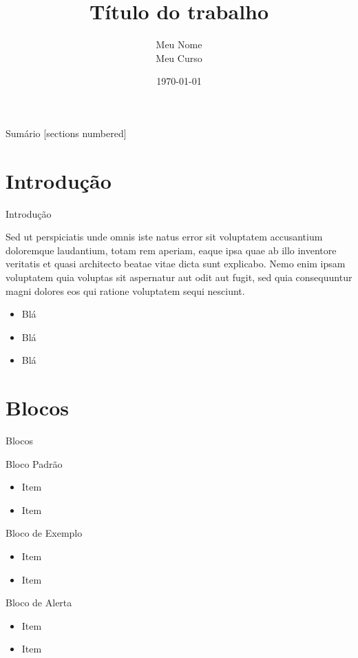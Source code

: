 \documentclass{beamer}
\title{Título do trabalho}
\date{\today}
\author{Meu Nome \\ Meu Curso}
\institute{Universidade Federal do Pampa}
\begin{document}
	
	\begin{frame}[noframenumbering]
		\titlepage
		\thispagestyle{empty}
	\end{frame}
	
	\begin{frame}{Sumário}
		[sections numbered]
		\tableofcontents[hideallsubsections]
	\end{frame}

\section{Introdução}
\begin{frame}{Introdução}
	
	Sed ut perspiciatis unde omnis iste natus error sit voluptatem accusantium doloremque laudantium, totam rem aperiam, eaque ipsa quae ab illo inventore veritatis et quasi architecto beatae vitae dicta sunt explicabo. Nemo enim ipsam voluptatem quia voluptas sit aspernatur aut odit aut fugit, sed quia consequuntur magni dolores eos qui ratione voluptatem sequi nesciunt. 
	
	\begin{itemize}
		\item Blá
		\item Blá
		\item Blá
	\end{itemize}

\end{frame}


\section{Blocos}

\begin{frame}{Blocos}

	\begin{block}{Bloco Padrão}
		\begin{itemize}
			\item Item
			\item Item
		\end{itemize}
	\end{block}
	
	
	\begin{exampleblock}{Bloco de Exemplo}
		\begin{itemize}
			\item Item
			\item Item
		\end{itemize}
	\end{exampleblock}
	
	\begin{alertblock}{Bloco de Alerta}
		\begin{itemize}
			\item Item
			\item Item
		\end{itemize}
	\end{alertblock}

\end{frame}
\end{document}
